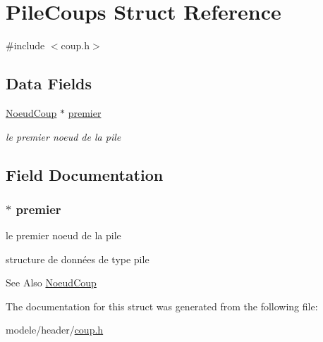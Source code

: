 \hypertarget{struct_pile_coups}{\section{Pile\-Coups Struct Reference}
\label{struct_pile_coups}
}


{\ttfamily \#include $<$coup.\-h$>$}

\subsection*{Data Fields}
\begin{DoxyCompactItemize}
\item 
\hyperlink{struct_noeud_coup}{Noeud\-Coup} $\ast$ \hyperlink{struct_pile_coups_a802a9656605b7ced41c351c9e73b8a66}{premier}
\begin{DoxyCompactList}\small\item\em le premier noeud de la pile \end{DoxyCompactList}\end{DoxyCompactItemize}


\subsection{Field Documentation}
\hypertarget{struct_pile_coups_a802a9656605b7ced41c351c9e73b8a66}{
\subsubsection[{premier}]{$\ast$ premier}}\label{struct_pile_coups_a802a9656605b7ced41c351c9e73b8a66}


le premier noeud de la pile 

structure de données de type pile \begin{DoxySeeAlso}{See Also}
\hyperlink{struct_noeud_coup}{Noeud\-Coup} 
\end{DoxySeeAlso}


The documentation for this struct was generated from the following file\-:\begin{DoxyCompactItemize}
\item 
modele/header/\hyperlink{coup_8h}{coup.\-h}\end{DoxyCompactItemize}

